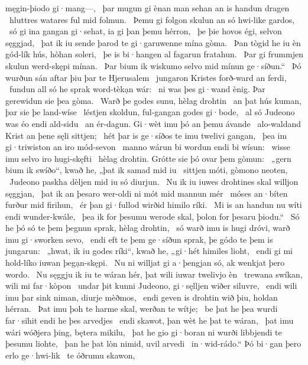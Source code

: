 męgin-þiodo gi·mang—, \hld\ þar mugun gi ènan man sehan
an is handun dragen \hld\ hluttres watares
ful mid folmun. \hld\ Þemu gi folgon skulun
an só hwi-like gardos, \hld\ só gi ina gangan gi·sehat,
ia gi þan þemu hérron, \hld\ þe þie hovos égi,
selvon sęggjad, \hld\ þat ik iu sende þarod
te gi·garuwenne mína gòma. \hld\ Þan tògid he iu èn gód-lík hús,
hòhan soleri, \hld\ þe is bi·hangen al
fagarun fratahun. \hld\ Þar gi frummjen skulun
werd-skępi mínan. \hld\ Þar bium ik wiskumo
selvo mid mínun ge·síðun.“ \hld\ Þó wurðun sán aftar þiu
þar te Hjerusalem \hld\ jungaron Kristes
forð-ward an ferdi, \hld\ fundun all só he sprak
word-tèkạn wár: \hld\ ni was þes gi·wand ènig.
Þar gerewidun sie þea gòma. \hld\ Warð þe godes sunu,
hèlag drohtin \hld\ an þat hús kuman,
þar sie þe land-wíse \hld\ léstjen skoldun,
ful-gangan godes gi·bode, \hld\ al só Judeono was
éo endi ald-sidu \hld\ an ér-dagun.
Gi·wèt imu þó an þemu ávande \hld\ alo-waldand Krist
an þene sęli sittjen; \hld\ hét þar is ge·síðos te imu
twelivi gangan, \hld\ þea im gi·triwiston
an iro mód-sevon \hld\ manno wárun
bi wordun endi bi wísun: \hld\ wisse imu selvo
iro hugi-skęfti \hld\ hèlag drohtin.
Grótte sie þó ovar þem gòmun: \hld\ „gern bium ik swíðo“, kwað he,
„þat ik samad mid iu \hld\ sittjen móti,
gòmono neoten, \hld\ Judeono paskha
dèljen mid iu só diurjun. \hld\ Nu ik iu iuwes drohtines skal
willjon sęggjan, \hld\ þat ik an þesaro wer-oldi ni mót
mid mannun mér \hld\ móses an·bíten
furður mid firihun, \hld\ ér þan gi·fullod wirðid
himilo ríki. \hld\ Mi is an handun nu
wíti endi wunder-kwále, \hld\ þea ik for þesumu werode skal,
þolon for þesaru þiodu.“ \hld\ Só he þó só te þem þegnun sprak,
hèlag drohtin, \hld\ só warð imu is hugi dróvi,
warð imu gi·sworken sevo, \hld\ endi eft te þem ge·síðun sprak,
þe gódo te þem is jungarun: \hld\ „hwat, ik iu godes ríki“, kwað he,
„gi·hét himiles lioht, \hld\ endi gi mi hold-líko
iuwan þegạn-skępi. \hld\ Nu ni willjat gi a·þengjan só,
ak wenkjat þero wordo. \hld\ Nu sęggju ik iu te wáran hér,
þat wili iuwar twelivjo èn \hld\ trewana swíkan,
wili mi far·kòpon \hld\ undar þit kunni Judeono,
gi·sęlljen wiðer siluvre, \hld\ endi wili imu þar sink niman,
diurje mèðmos, \hld\ endi geven is drohtin wið þiu,
holdan hérran. \hld\ Þat imu þoh te harme skal,
werðan te wítje; \hld\ be þat he þea wurdi far·sihit
endi he þes arvedjes \hld\ endi skawot,
þan wèt he þat te wáran, \hld\ þat imu wári wóðjera þing,
bętera mikilu, \hld\ þat he gio gi·boran ni wurði
libbjendi te þesumu liohte, \hld\ þan he þat lòn nimid,
uvil arvedi \hld\ in·wid-rádo.“
Þó bi·gan þero erlo ge·hwi-lik \hld\ te óðrumu skawon,
